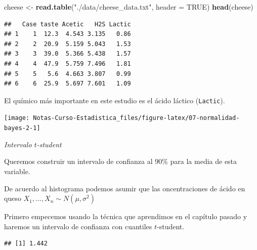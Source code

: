 \documentclass[
  12pt,
]{book}
\newenvironment{Shaded}{\begin{snugshade}}{\end{snugshade}}
\newcommand{\DataTypeTok}[1]{\textcolor[rgb]{0.13,0.29,0.53}{#1}}
\newcommand{\KeywordTok}[1]{\textcolor[rgb]{0.13,0.29,0.53}{\textbf{#1}}}
\newcommand{\NormalTok}[1]{#1}
\newcommand{\OperatorTok}[1]{\textcolor[rgb]{0.81,0.36,0.00}{\textbf{#1}}}
\newcommand{\OtherTok}[1]{\textcolor[rgb]{0.56,0.35,0.01}{#1}}
\newcommand{\StringTok}[1]{\textcolor[rgb]{0.31,0.60,0.02}{#1}}
\begin{document}
\begin{Shaded}
\begin{Highlighting}[]
\NormalTok{cheese \textless{}{-}}\StringTok{ }\KeywordTok{read.table}\NormalTok{(}\StringTok{"./data/cheese\_data.txt"}\NormalTok{, }\DataTypeTok{header =} \OtherTok{TRUE}\NormalTok{)}
\KeywordTok{head}\NormalTok{(cheese)}
\end{Highlighting}
\end{Shaded}

\begin{verbatim}
##   Case taste Acetic   H2S Lactic
## 1    1  12.3  4.543 3.135   0.86
## 2    2  20.9  5.159 5.043   1.53
## 3    3  39.0  5.366 5.438   1.57
## 4    4  47.9  5.759 7.496   1.81
## 5    5   5.6  4.663 3.807   0.99
## 6    6  25.9  5.697 7.601   1.09
\end{verbatim}

El químico más importante en este estudio es el ácido láctico (\texttt{Lactic}).

\begin{Shaded}
\end{Shaded}

\begin{center}\texttt{[image: Notas-Curso-Estadistica\_files/figure-latex/07-normalidad-bayes-2-1]} \end{center}

\emph{Intervalo \(t\)-student}

Queremos construir un intervalo de confianza al 90\% para la media
de esta variable.

De acuerdo al histograma podemos asumir que las oncentraciones de ácido en queso
\(X_1,\dots, X_n\sim N(\mu,\sigma^2)\)

Primero empecemos usando la técnica que aprendimos en el capítulo pasado y
haremos un intervalo de confianza con cuantiles \(t\)-student.

\begin{Shaded}
\end{Shaded}

\begin{verbatim}
## [1] 1.442
\end{verbatim}
\end{document}
